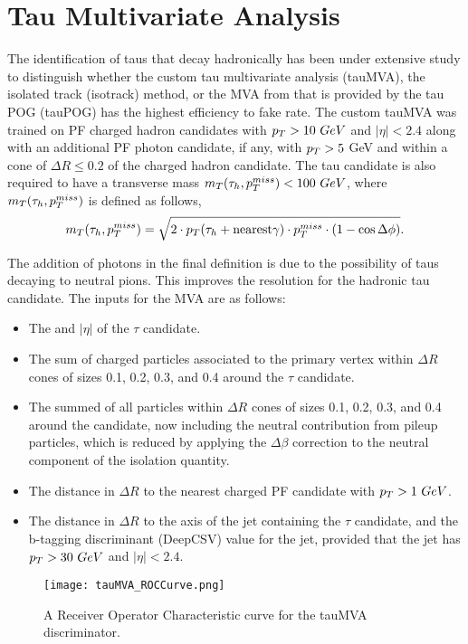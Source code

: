 \chapter{Tau Multivariate Analysis}\label{sec:TauMVA}

The identification of taus that decay hadronically has been under extensive study to distinguish whether the custom tau multivariate analysis (tauMVA), the isolated track (isotrack) method, or the MVA from that is provided by the tau POG (tauPOG) has the highest efficiency to fake rate. The custom tauMVA was trained on PF charged hadron candidates with $p_{T}>10~GeV$ and $|\eta|<2.4$ along with an additional PF photon candidate, if any, with $p_{T}>5$ GeV and within a cone of $\Delta R\leq0.2$ of the charged hadron candidate. The tau candidate is also required to have a transverse mass $m_T(\tau_h,p_{T}^{miss})<100~GeV$, where $m_T(\tau_h,p_{T}^{miss})$ is defined as follows,
\begin{equation}\label{tauMT}
m_T(\tau_h,p_{T}^{miss})=\sqrt{2\cdot p_{T}(\tau_h+\text{nearest}\gamma)\cdot p_{T}^{miss}\cdot(1-\cos\Delta\phi)}.
\end{equation}

The addition of photons in the final definition is due to the possibility of taus decaying to neutral pions. This improves the resolution for the hadronic tau candidate. The inputs for the MVA are as follows:
\begin{itemize}
	\item The \pt{} and $|\eta|$ of the $\tau$ candidate.
	\item The sum \pt{} of charged particles associated to the primary vertex within $\Delta R$ cones of sizes 0.1, 0.2, 0.3, and 0.4 around the $\tau$ candidate.
	\item The summed \pt{} of all particles within $\Delta R$ cones of sizes 0.1, 0.2, 0.3, and 0.4 around the candidate, now including the neutral contribution from pileup particles, which is reduced by applying the $\Delta \beta$ correction to the neutral component of the isolation quantity. 
	\item The distance in $\Delta R$ to the nearest charged PF candidate with $p_{T}>1~GeV$.
	\item The distance in $\Delta R$ to the axis of the jet containing the $\tau$ candidate, and the b-tagging discriminant (DeepCSV) value for the jet, provided that the jet has $p_{T}>30~GeV$ and $|\eta|<2.4$.
\end{itemize}

\begin{figure}
 	\centering
	\texttt{[image: tauMVA\_ROCCurve.png]}
 	\caption[Tau MVA ROC Curve]{A Receiver Operator Characteristic curve for the tauMVA discriminator.}
 	\label{tauMVAROCCurve} 
\end{figure}

